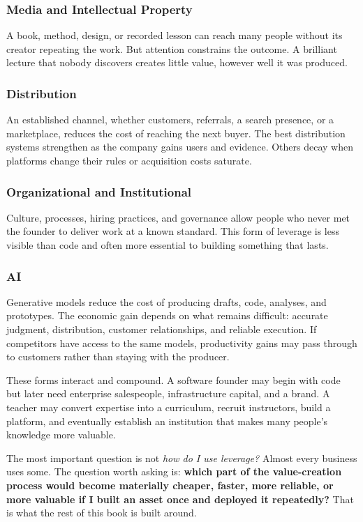 \subsubsection{Media and Intellectual Property} A book, method, design, or recorded lesson can reach many people without its creator repeating the work. But attention constrains the outcome. A brilliant lecture that nobody discovers creates little value, however well it was produced.

\subsubsection{Distribution} An established channel, whether customers, referrals, a search presence, or a marketplace, reduces the cost of reaching the next buyer. The best distribution systems strengthen as the company gains users and evidence. Others decay when platforms change their rules or acquisition costs saturate.

\subsubsection{Organizational and Institutional} Culture, processes, hiring practices, and governance allow people who never met the founder to deliver work at a known standard. This form of leverage is less visible than code and often more essential to building something that lasts.

\subsubsection{AI} Generative models reduce the cost of producing drafts, code, analyses, and prototypes. The economic gain depends on what remains difficult: accurate judgment, distribution, customer relationships, and reliable execution. If competitors have access to the same models, productivity gains may pass through to customers rather than staying with the producer.

These forms interact and compound. A software founder may begin with code but later need enterprise salespeople, infrastructure capital, and a brand. A teacher may convert expertise into a curriculum, recruit instructors, build a platform, and eventually establish an institution that makes many people's knowledge more valuable.

The most important question is not \emph{how do I use leverage?} Almost every business uses some. The question worth asking is: \textbf{which part of the value-creation process would become materially cheaper, faster, more reliable, or more valuable if I built an asset once and deployed it repeatedly?} That is what the rest of this book is built around.

